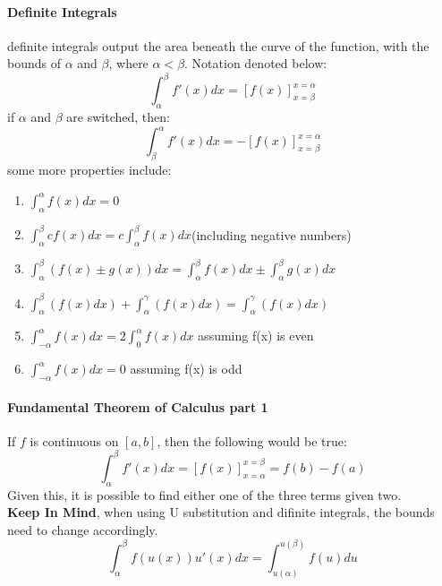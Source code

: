 \documentclass{article} %
\begin{document}
                    \paragraph{Definite Integrals}
                        definite integrals output the area beneath the curve of the function, with the bounds of $\alpha$ and $\beta$, where $\alpha<\beta$. Notation denoted below:
                        $$\int_{\alpha}^{\beta}f'(x) dx = [f(x)]^{x=\alpha}_{x=\beta}$$ 
                        if $\alpha$ and $\beta$ are switched, then:
                        $$\int_{\beta}^{\alpha}f'(x) dx = -[f(x)]^{x=\alpha}_{x=\beta}$$
                        some more properties include:
                        \begin{enumerate}
                            \item $\int ^{\alpha}_{\alpha}f(x)dx = 0$
                            \item $\int _{\alpha}^{\beta}cf(x)dx =c\int _{\alpha}^{\beta}f(x)dx$(including negative numbers)
                            \item $\int _{\alpha}^{\beta}(f(x)\pm g(x))dx = \int _{\alpha}^{\beta}f(x)dx\pm \int _{\alpha}^{\beta} g(x)dx$
                            \item $\int _{\alpha}^{\beta}(f(x)dx)+\int ^{\gamma}_{\alpha}(f(x)dx)=\int ^{\gamma}_{\alpha}(f(x)dx)$
                            \item $\int ^{\alpha}_{-\alpha}f(x)dx=2\int ^{\alpha}_{0}f(x)dx$ assuming f(x) is even
                            \item $\int ^{\alpha}_{-\alpha}f(x)dx=0$ assuming f(x) is odd
                        \end{enumerate}
                    \paragraph{Fundamental Theorem of Calculus part 1}
                        If $f$ is continuous on $[a,b]$, then the following would be true:
                        \begin{equation}
                            \int^\beta_\alpha f'(x)dx = [f(x)]^{x=\beta}_{x=\alpha}=f(b)-f(a)
                        \end{equation}
                        Given this, it is possible to find either one of the three terms given two. 
                        \\\textbf{Keep In Mind}, when using U substitution and difinite integrals, the bounds need to change accordingly.
                        \begin{equation}
                            \int^\beta_\alpha f(u(x))u'(x)dx = \int^{u(\beta)}_{u(\alpha)}f(u)du
                        \end{equation}
                        
\end{document}
